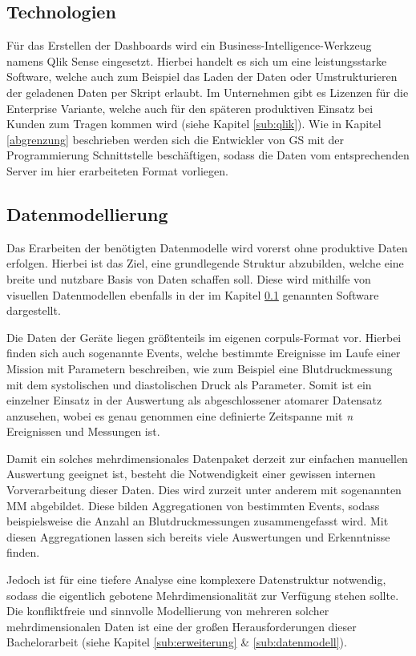 \subsection{Technologien}\label{tech}
Für das Erstellen der Dashboards wird ein Business-Intelligence-Werkzeug namens \glqq Qlik Sense\grqq{} eingesetzt.
Hierbei handelt es sich um eine leistungsstarke Software, welche auch zum Beispiel das Laden der Daten oder Umstrukturieren der geladenen Daten per Skript erlaubt.
Im Unternehmen gibt es Lizenzen für die Enterprise Variante, welche auch für den späteren produktiven Einsatz bei Kunden zum Tragen kommen wird (siehe Kapitel \ref{sub:qlik}).
Wie in Kapitel \ref{abgrenzung} beschrieben werden sich die Entwickler von \gls{GS} mit der Programmierung Schnittstelle beschäftigen, sodass die Daten vom entsprechenden Server im hier erarbeiteten Format vorliegen.

\subsection{Datenmodellierung}
Das Erarbeiten der benötigten Datenmodelle wird vorerst ohne produktive Daten erfolgen.
Hierbei ist das Ziel, eine grundlegende Struktur abzubilden, welche eine breite und nutzbare Basis von Daten schaffen soll.
Diese wird mithilfe von visuellen Datenmodellen ebenfalls in der im Kapitel \ref{tech} genannten
Software dargestellt.

Die Daten der Geräte liegen größtenteils im eigenen \glqq corpuls\grqq{}-Format vor. 
Hierbei finden sich auch sogenannte \glqq Events\grqq{}, welche bestimmte Ereignisse im Laufe einer Mission mit Parametern beschreiben, wie zum Beispiel eine Blutdruckmessung mit dem systolischen und diastolischen Druck als Parameter.
Somit ist ein einzelner Einsatz in der Auswertung als abgeschlossener atomarer Datensatz anzusehen, wobei es genau genommen eine definierte Zeitspanne mit \textit{n} Ereignissen und Messungen ist. 

Damit ein solches mehrdimensionales Datenpaket derzeit zur einfachen manuellen Auswertung geeignet ist, besteht die Notwendigkeit einer gewissen internen Vorverarbeitung dieser Daten.
Dies wird zurzeit unter anderem mit sogenannten \glqq \gls{MM} \grqq{} abgebildet.
Diese bilden Aggregationen von bestimmten Events, sodass beispielsweise die Anzahl an Blutdruckmessungen zusammengefasst wird. 
Mit diesen Aggregationen lassen sich bereits viele Auswertungen und Erkenntnisse finden.

Jedoch ist für eine tiefere Analyse eine komplexere Datenstruktur notwendig, sodass die eigentlich gebotene Mehrdimensionalität zur Verfügung stehen sollte. 
Die konfliktfreie und sinnvolle Modellierung von mehreren solcher mehrdimensionalen Daten ist eine der großen Herausforderungen dieser Bachelorarbeit (siehe Kapitel \ref{sub:erweiterung} \& \ref{sub:datenmodell}).
